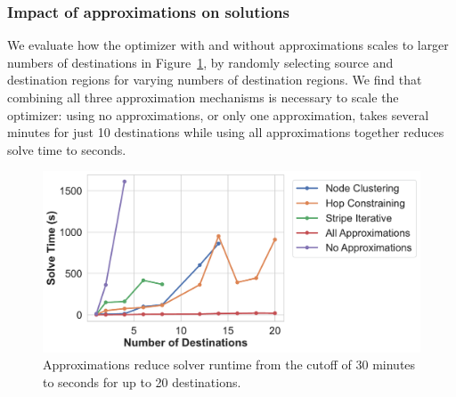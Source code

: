 \subsubsection{Impact of approximations on solutions} 
\label{sss:solution_qual_eval}


We evaluate how the optimizer with and without approximations scales to larger numbers of destinations in Figure~\ref{fig:solve_time}, by randomly selecting source and destination regions for varying numbers of destination regions. 
We find that combining all three approximation mechanisms is necessary to scale the optimizer: using no approximations, or only one approximation, takes several minutes for just 10 destinations while using all approximations together reduces solve time to seconds. 


\begin{figure}[t]
    \centering
    \includegraphics[width=0.9\linewidth]{figures/solve_time_versus_num_dest.pdf}
    \caption{Approximations reduce solver runtime from the cutoff of 30 minutes to seconds for up to 20 destinations.
    }
    \label{fig:solve_time}
\end{figure}


